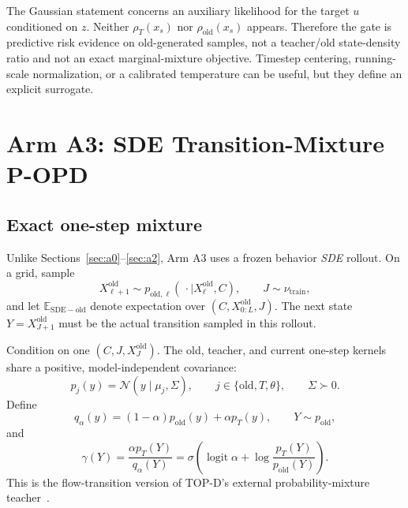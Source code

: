 \documentclass[11pt,a4paper]{article}
\newcommand{\E}{\mathbb{E}}
\newcommand{\N}{\mathcal{N}}
\DeclareMathOperator{\logit}{logit}
\theoremstyle{plain}
\theoremstyle{definition}
\begin{document}
\begin{tcolorbox}[colback=yellow!5,colframe=yellow!45!black,title=Exact boundary of Arm A2]
The Gaussian statement concerns an auxiliary likelihood for the target $u$ conditioned on $z$.
Neither $\rho_T(x_s)$ nor $\rho_{\mathrm{old}}(x_s)$ appears.  Therefore the gate is predictive
risk evidence on old-generated samples, not a teacher/old state-density ratio and not an exact
marginal-mixture objective.  Timestep centering, running-scale normalization, or a calibrated
temperature can be useful, but they define an explicit surrogate.
\end{tcolorbox}

\section{Arm A3: SDE Transition-Mixture P-OPD}
\label{sec:a3}

\subsection{Exact one-step mixture}

Unlike Sections~\ref{sec:a0}--\ref{sec:a2}, Arm A3 uses a frozen behavior \emph{SDE} rollout.
On a grid, sample
\begin{equation}
X_{\ell+1}^{\mathrm{old}}
\sim
p_{\mathrm{old},\ell}(
  \,\cdot\mid X_\ell^{\mathrm{old}},C
),
\qquad
J\sim\nu_{\mathrm{train}},
\label{eq:a3-behavior-rollout}
\end{equation}
and let $\E_{\mathrm{SDE-old}}$ denote expectation over
$(C,X_{0:L}^{\mathrm{old}},J)$.  The next state
$Y=X_{J+1}^{\mathrm{old}}$ must be the actual transition sampled in this rollout.

Condition on one $(C,J,X_J^{\mathrm{old}})$.  The old, teacher, and current one-step kernels share
a positive, model-independent covariance:
\begin{equation}
p_j(y)=\N(y\mid\mu_j,\Sigma),
\qquad
j\in\{\mathrm{old},T,\theta\},
\qquad
\Sigma\succ0.
\label{eq:a3-kernels}
\end{equation}
Define
\begin{equation}
q_\alpha(y)
=(1-\alpha)p_{\mathrm{old}}(y)+\alpha p_T(y),
\qquad
Y\sim p_{\mathrm{old}},
\label{eq:a3-mixture}
\end{equation}
and
\begin{equation}
\gamma(Y)
=
\frac{\alpha p_T(Y)}{q_\alpha(Y)}
=
\sigma\!\left(
  \logit\alpha
  +\log\frac{p_T(Y)}{p_{\mathrm{old}}(Y)}
\right).
\label{eq:a3-responsibility}
\end{equation}
This is the flow-transition version of TOP-D's external probability-mixture
teacher~\cite{topd}.
\end{document}
